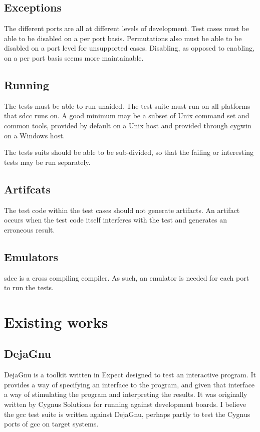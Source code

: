 \documentclass{widearticle}
\begin{document}
\subsection{Exceptions}
The different ports are all at different levels of development.  Test
cases must be able to be disabled on a per port basis.  Permutations
also must be able to be disabled on a port level for unsupported
cases.  Disabling, as opposed to enabling, on a per port basis seems
more maintainable.

\subsection{Running}
The tests must be able to run unaided.  The test suite must run on all
platforms that sdcc runs on.  A good minimum may be a subset of Unix
command set and common tools, provided by default on a Unix host and
provided through cygwin on a Windows host.

The tests suits should be able to be sub-divided, so that the failing
or interesting tests may be run separately.

\subsection{Artifcats}
The test code within the test cases should not generate artifacts.  An
artifact occurs when the test code itself interferes with the test and
generates an erroneous result.

\subsection{Emulators}
sdcc is a cross compiling compiler.  As such, an emulator is needed
for each port to run the tests.

\section{Existing works}
\subsection{DejaGnu}
DejaGnu is a toolkit written in Expect designed to test an interactive
program.  It provides a way of specifying an interface to the program,
and given that interface a way of stimulating the program and
interpreting the results.  It was originally written by Cygnus
Solutions for running against development boards.  I believe the gcc
test suite is written against DejaGnu, perhaps partly to test the
Cygnus ports of gcc on target systems.
\end{document}
